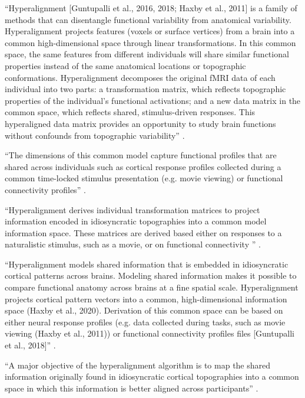 %
``Hyperalignment [Guntupalli et al., 2016, 2018; Haxby et al., 2011] is a family
of methods that can disentangle functional variability from anatomical
variability. Hyperalignment projects features (voxels or surface vertices) from
a brain into a common high-dimensional space through linear transformations. In
this common space, the same features from different individuals will share
similar functional properties instead of the same anatomical locations or
topographic conformations. Hyperalignment decomposes the original fMRI data of
each individual into two parts: a transformation matrix, which reflects
topographic properties of the individual's functional activations; and a new
data matrix in the common space, which reflects shared, stimulus-driven
responses. This hyperaligned data matrix provides an opportunity to study brain
functions without confounds from topographic variability''
\citep{feilong2018reliable}.

%
``The dimensions of this common model capture functional profiles that are
shared across individuals such as cortical response profiles collected during a
common time-locked stimulus presentation (e.g. movie viewing) or functional
connectivity profiles'' \citep{busch2021hybrid}.

%
``Hyperalignment derives individual transformation matrices to project
information encoded in idiosyncratic topographies into a common model
information space. These matrices are derived based either on responses to a
naturalistic stimulus, such as a movie, or on functional connectivity
\citep{guntupalli2018computational}'' \citep{jiahui2020predicting}.

%
``Hyperalignment models shared information that is embedded in idiosyncratic
cortical patterns across brains. Modeling shared information makes it possible
to compare functional anatomy across brains at a fine spatial scale.
Hyperalignment projects cortical pattern vectors into a common, high-dimensional
information space (Haxby et al., 2020). Derivation of this common space can be
based on either neural response profiles (e.g. data collected during tasks, such
as movie viewing (Haxby et al., 2011)) or functional connectivity profiles files
[Guntupalli et al., 2018]'' \citep{busch2021hybrid}.

%
``A major objective of the hyperalignment algorithm is to map the shared
information originally found in idiosyncratic cortical topographies into a
common space in which this information is better aligned across participants''
\citep{busch2021hybrid}.



